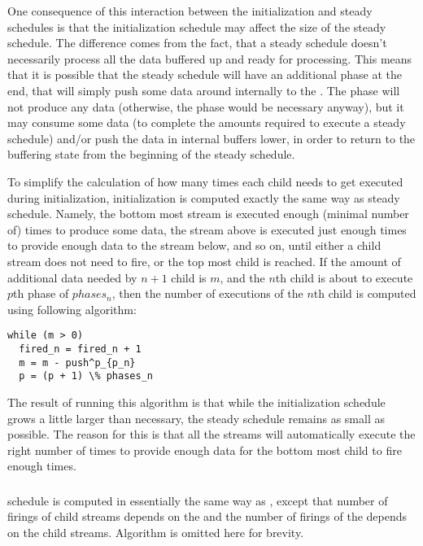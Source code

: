 One consequence of this interaction between the initialization and
steady schedules is that the initialization schedule may affect
the size of the steady schedule.  The difference comes from the
fact, that a steady schedule doesn't necessarily process all the
data buffered up and ready for processing.  This means that it is
possible that the steady schedule will have an additional phase at
the end, that will simply push some data around internally to the
{\pipeline}.  The phase will not produce any data (otherwise, the
phase would be necessary anyway), but it may consume some data (to
complete the amounts required to execute a steady schedule) and/or
push the data in internal buffers lower, in order to return to the
buffering state from the beginning of the steady schedule.

To simplify the calculation of how many times each child needs to
get executed during initialization, initialization is computed
exactly the same way as steady schedule.  Namely, the bottom most
stream is executed enough (minimal number of) times to produce
some data, the stream above is executed just enough times to
provide enough data to the stream below, and so on, until either a
child stream does not need to fire, or the top most child is
reached. If the amount of additional data needed by $n+1$ child is
$m$, and the $n$th child is about to execute $p$th phase of
$phases_n$, then the number of executions of the $n$th child is
computed using following algorithm:

\begin{singlespace}
\begin{verbatim}
while (m > 0)
  fired_n = fired_n + 1
  m = m - push^p_{p_n}
  p = (p + 1) \% phases_n
\end{verbatim}
\end{singlespace}

The result of running this algorithm is that while the
initialization schedule grows a little larger than necessary, the
steady schedule remains as small as possible.  The reason for this
is that all the streams will automatically execute the right
number of times to provide enough data for the bottom most child
to fire enough times.

\subsubsection{\splitjoin}

{\splitjoin} schedule is computed in essentially the same way as
{\pipeline}, except that number of firings of child streams depends
on the {\joiner} and the number of firings of the {\splitter} depends
on the child streams.  Algorithm is omitted here for brevity.

